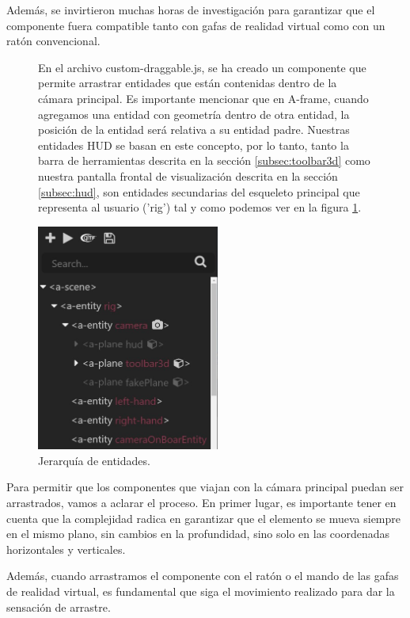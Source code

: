 \documentclass[a4paper, 11pt]{book}
\begin{document}
Además, se invirtieron muchas horas de investigación para garantizar que el componente fuera compatible tanto con gafas de realidad virtual como con un ratón convencional.
\begin{figure}[H]
  \begin{minipage}[b]{0.58\linewidth}
    En el archivo custom-draggable.js, se ha creado un componente que permite arrastrar entidades que están contenidas dentro de la cámara principal. Es importante mencionar que en A-frame, cuando agregamos una entidad con geometría dentro de otra entidad, la posición de la entidad será relativa a su entidad padre. Nuestras entidades HUD se basan en este concepto, por lo tanto, tanto la barra de herramientas descrita en la sección \ref{subsec:toolbar3d} como nuestra pantalla frontal de visualización descrita en la sección \ref{subsec:hud}, son entidades secundarias del esqueleto principal que representa al usuario ('rig') tal y como podemos ver en la figura \ref{fig:jerarquiaEntidadesRig}.
  \end{minipage}%
  \hfill
  \begin{minipage}[b]{0.4\linewidth}
    \centering
    \includegraphics[width=6cm, keepaspectratio]{img/jerarquiaRig.jpg}
    \caption{Jerarquía de entidades.}
    \label{fig:jerarquiaEntidadesRig}    
  \end{minipage}
\end{figure}

Para permitir que los componentes que viajan con la cámara principal puedan ser arrastrados, vamos a aclarar el proceso. En primer lugar, es importante tener en cuenta que la complejidad radica en garantizar que el elemento se mueva siempre en el mismo plano, sin cambios en la profundidad, sino solo en las coordenadas horizontales y verticales.

Además, cuando arrastramos el componente con el ratón o el mando de las gafas de realidad virtual, es fundamental que siga el movimiento realizado para dar la sensación de arrastre.
\end{document}
